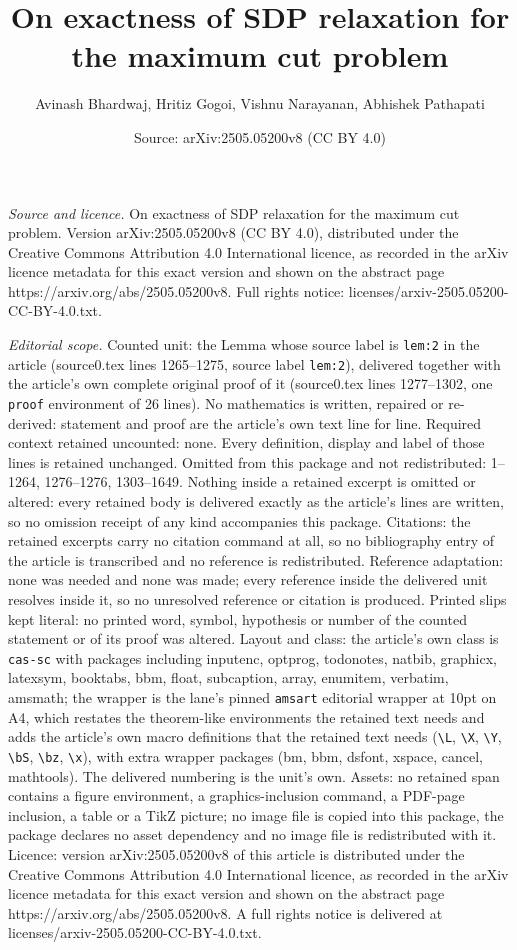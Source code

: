 \documentclass[10pt,a4paper]{amsart}
\title[On exactness of SDP relaxation for the maximum cut problem]{On exactness of SDP relaxation for the maximum cut problem}
\author{Avinash Bhardwaj, Hritiz Gogoi, Vishnu Narayanan, Abhishek Pathapati}
\date{Source: arXiv:2505.05200v8 (CC BY 4.0)}
\begin{document}
\maketitle

\noindent\emph{Source and licence.} On exactness of SDP relaxation for the maximum cut problem. Version arXiv:2505.05200v8 (CC BY 4.0), distributed under the Creative Commons Attribution 4.0 International licence, as recorded in the arXiv licence metadata for this exact version and shown on the abstract page https://arxiv.org/abs/2505.05200v8. Full rights notice: licenses/arxiv-2505.05200-CC-BY-4.0.txt.\par\smallskip

\noindent\textit{Editorial scope.} Counted unit: the Lemma whose source label is \texttt{lem:2} in the article (source0.tex lines 1265--1275, source label \texttt{lem:2}), delivered together with the article's own complete original proof of it (source0.tex lines 1277--1302, one \texttt{proof} environment of 26 lines). No mathematics is written, repaired or re-derived: statement and proof are the article's own text line for line. Required context retained uncounted: none. Every definition, display and label of those lines is retained unchanged. Omitted from this package and not redistributed: 1--1264, 1276--1276, 1303--1649. Nothing inside a retained excerpt is omitted or altered: every retained body is delivered exactly as the article's lines are written, so no omission receipt of any kind accompanies this package. Citations: the retained excerpts carry no citation command at all, so no bibliography entry of the article is transcribed and no reference is redistributed. Reference adaptation: none was needed and none was made; every reference inside the delivered unit resolves inside it, so no unresolved reference or citation is produced. Printed slips kept literal: no printed word, symbol, hypothesis or number of the counted statement or of its proof was altered. Layout and class: the article's own class is \texttt{cas-sc} with packages including inputenc, optprog, todonotes, natbib, graphicx, latexsym, booktabs, bbm, float, subcaption, array, enumitem, verbatim, amsmath; the wrapper is the lane's pinned \texttt{amsart} editorial wrapper at 10pt on A4, which restates the theorem-like environments the retained text needs and adds the article's own macro definitions that the retained text needs (\texttt{\textbackslash L}, \texttt{\textbackslash X}, \texttt{\textbackslash Y}, \texttt{\textbackslash bS}, \texttt{\textbackslash bz}, \texttt{\textbackslash x}), with extra wrapper packages (bm, bbm, dsfont, xspace, cancel, mathtools). The delivered numbering is the unit's own. Assets: no retained span contains a figure environment, a graphics-inclusion command, a PDF-page inclusion, a table or a TikZ picture; no image file is copied into this package, the package declares no asset dependency and no image file is redistributed with it. Licence: version arXiv:2505.05200v8 of this article is distributed under the Creative Commons Attribution 4.0 International licence, as recorded in the arXiv licence metadata for this exact version and shown on the abstract page https://arxiv.org/abs/2505.05200v8. A full rights notice is delivered at licenses/arxiv-2505.05200-CC-BY-4.0.txt. 
\end{document}
